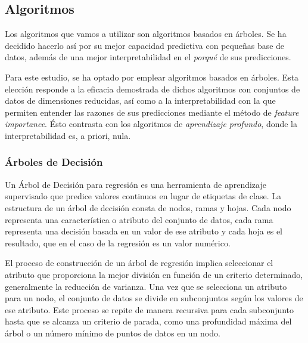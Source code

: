 \documentclass[12pt]{article}
\begin{document}
\subsection{Algoritmos}

Los algoritmos que vamos a utilizar son algoritmos basados en árboles. Se ha decidido hacerlo así por su mejor capacidad predictiva con pequeñas base de datos, además de una mejor interpretabilidad en el \textit{porqué} de sus predicciones.



Para este estudio, se ha optado por emplear algoritmos basados en árboles. Esta elección responde a la eficacia demostrada de dichos algoritmos con conjuntos de datos de dimensiones reducidas, así como a la interpretabilidad con la que permiten entender las razones de sus predicciones mediante el método de \textit{feature importance}. Ésto contrasta con los algoritmos de \textit{aprendizaje profundo}, donde la interpretabilidad es, a priori, nula.

\subsubsection{Árboles de Decisión}

Un Árbol de Decisión para regresión es una herramienta de aprendizaje supervisado que predice valores continuos en lugar de etiquetas de clase. La estructura de un árbol de decisión consta de nodos, ramas y hojas. Cada nodo representa una característica o atributo del conjunto de datos, cada rama representa una decisión basada en un valor de ese atributo y cada hoja es el resultado, que en el caso de la regresión es un valor numérico.

El proceso de construcción de un árbol de regresión implica seleccionar el atributo que proporciona la mejor división en función de un criterio determinado, generalmente la reducción de varianza. Una vez que se selecciona un atributo para un nodo, el conjunto de datos se divide en subconjuntos según los valores de ese atributo. Este proceso se repite de manera recursiva para cada subconjunto hasta que se alcanza un criterio de parada, como una profundidad máxima del árbol o un número mínimo de puntos de datos en un nodo.
\end{document}
